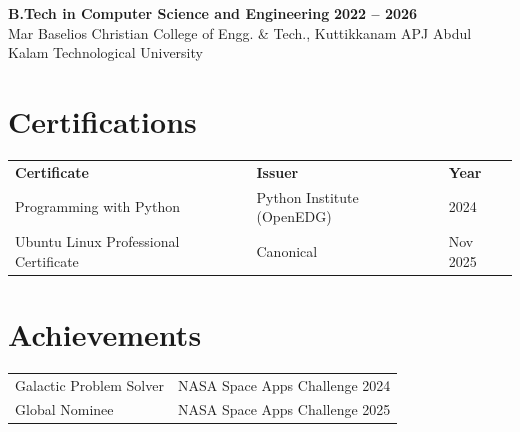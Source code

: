 \documentclass[10pt, a4paper]{article}
\begin{document}
\textbf{B.Tech in Computer Science and Engineering} \hfill \textbf{2022 -- 2026}\\
Mar Baselios Christian College of Engg. \& Tech., Kuttikkanam \hfill APJ Abdul Kalam Technological University

\section*{Certifications}

\renewcommand{\arraystretch}{1.1}
\begin{tabular}{@{} p{7.8cm} p{6.5cm} p{2.5cm} @{}}
\textbf{Certificate}                  & \textbf{Issuer}              & \textbf{Year} \\[1pt]
Programming with Python               & Python Institute (OpenEDG)   & 2024 \\
Ubuntu Linux Professional Certificate & Canonical                    & Nov 2025 \\
\end{tabular}

\section*{Achievements}

\begin{tabular}{@{} p{9.5cm} p{8cm} @{}}
Galactic Problem Solver              & NASA Space Apps Challenge 2024 \\
Global Nominee                       & NASA Space Apps Challenge 2025 \\
\end{tabular}
\end{document}
